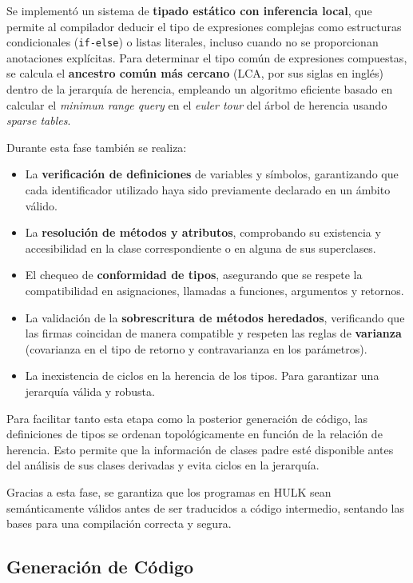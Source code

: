 \documentclass{article}
\begin{document}
Se implementó un sistema de \textbf{tipado estático con inferencia local}, que permite al compilador deducir el tipo de expresiones complejas como estructuras condicionales (\texttt{if-else}) o listas literales, incluso cuando no se proporcionan anotaciones explícitas. Para determinar el tipo común de expresiones compuestas, se calcula el \textbf{ancestro común más cercano} (LCA, por sus siglas en inglés) dentro de la jerarquía de herencia, empleando un algoritmo eficiente basado en calcular el \textit{minimun range query} en el \textit{euler tour} del árbol de herencia usando \textit{sparse tables}.

Durante esta fase también se realiza:

\begin{itemize}
    \item La \textbf{verificación de definiciones} de variables y símbolos, garantizando que cada identificador utilizado haya sido previamente declarado en un ámbito válido.
    \item La \textbf{resolución de métodos y atributos}, comprobando su existencia y accesibilidad en la clase correspondiente o en alguna de sus superclases.
    \item El chequeo de \textbf{conformidad de tipos}, asegurando que se respete la compatibilidad en asignaciones, llamadas a funciones, argumentos y retornos.
    \item La validación de la \textbf{sobrescritura de métodos heredados}, verificando que las firmas coincidan de manera compatible y respeten las reglas de \textbf{varianza} (covarianza en el tipo de retorno y contravarianza en los parámetros).
    \item La inexistencia de ciclos en la herencia de los tipos. Para garantizar una jerarquía válida y robusta.
\end{itemize}

Para facilitar tanto esta etapa como la posterior generación de código, las definiciones de tipos se ordenan topológicamente en función de la relación de herencia. Esto permite que la información de clases padre esté disponible antes del análisis de sus clases derivadas y evita ciclos en la jerarquía.

Gracias a esta fase, se garantiza que los programas en HULK sean semánticamente válidos antes de ser traducidos a código intermedio, sentando las bases para una compilación correcta y segura.

\subsection{Generación de Código}
\end{document}
